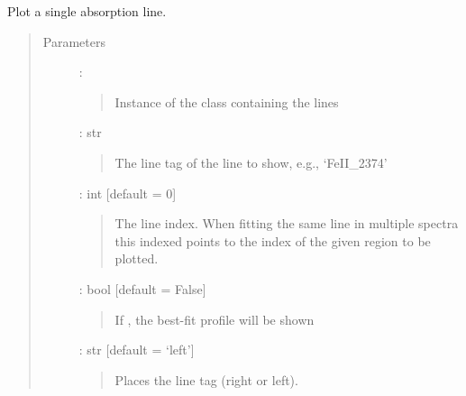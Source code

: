 \documentclass[letterpaper,10pt,english]{sphinxmanual}
\begin{document}
\begin{fulllineitems}
\label{\detokenize{api:output.plot_single_line}}
Plot a single absorption line.
\begin{quote}\begin{description}
\item[{Parameters}] \leavevmode
{} : {\hyperref[\detokenize{api:VoigtFit.DataSet}]{}}
\begin{quote}

Instance of the {\hyperref[\detokenize{api:VoigtFit.DataSet}]{}} class containing the lines
\end{quote}

 : str
\begin{quote}

The line tag of the line to show, e.g., ‘FeII\_2374’
\end{quote}

 : int   {[}default = 0{]}
\begin{quote}

The line index. When fitting the same line in multiple
spectra this indexed points to the index of the given
region to be plotted.
\end{quote}

 : bool   {[}default = False{]}
\begin{quote}

If , the best-fit profile will be shown
\end{quote}

 : str   {[}default = ‘left’{]}
\begin{quote}

Places the line tag (right or left).
\end{quote}


\end{description}
\end{quote}
\end{fulllineitems}
\end{document}
